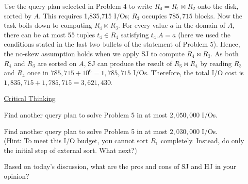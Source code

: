 \begin{sol}
     Use the query plan selected in Problem 4 to write $R_4 = R_1 \bowtie R_2$ onto the disk, sorted by $A$. This requires 1,835,715 I/Os; $ R_3$ occupies $785,715$ blocks. Now the task boils down to computing $R_4 \bowtie R_3$. For every value $a$ in the domain of $A$, there can be at most 55 tuples $t_4 \in R_4$ satisfying $t_4.A = a$ (here we used the conditions stated in the last two bullets of the statement of Problem 5). Hence, the no-skew assumption holds when we apply SJ to compute $R_4 \bowtie R_3$.
    As both $R_4$ and $R_3$ are sorted on $A$, SJ can produce the result of $R_3 \bowtie R_4$ by reading $R_3$ and $R_4$ once in $785,715 + 10^6 = 1,785,715$ I/Os. Therefore, the total I/O cost is $1,835,715 + 1,785,715 = 3,621,430$.
\end{sol}

\begin{center}
    \uline{Critical Thinking}
\end{center}

 Find another query plan to solve Problem 5 in at most $2,050,000$ I/Os.

 Find another query plan to solve Problem 5 in at most $2,030,000$ I/Os. \\
(Hint: To meet this I/O budget, you cannot sort $R_1$ completely. Instead, do only the initial step of external sort. What next?)

 Based on today's discussion, what are the pros and cons of SJ and HJ in your opinion?



